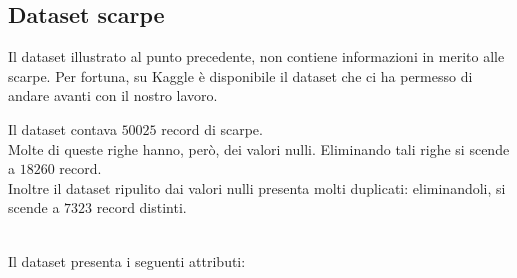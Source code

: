 \documentclass[a4paper, 11pt, oneside]{report}
\begin{document}
                \subsection{Dataset scarpe}
                Il dataset illustrato al punto precedente, non contiene informazioni in merito alle scarpe.
                Per fortuna, su Kaggle \cite{3} è disponibile il dataset \cite{7} che ci ha permesso di andare avanti con il nostro lavoro.
                \\
                \par \noindent Il dataset contava $50025$ record di scarpe.
                \\
                Molte di queste righe hanno, però, dei valori nulli.
                Eliminando tali righe si scende a $18260$ record.\\
                Inoltre il dataset ripulito dai valori nulli presenta molti duplicati: eliminandoli, si scende a $7323$ record distinti.\\
                \\
                \par \noindent Il dataset presenta i seguenti attributi:
\end{document}
